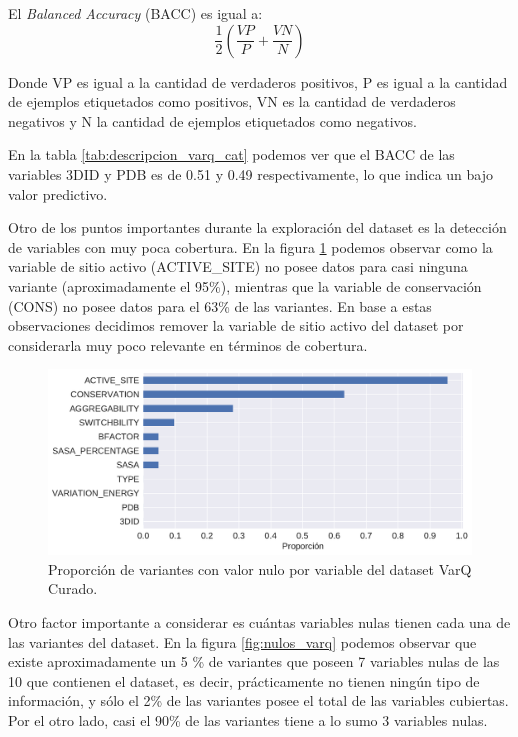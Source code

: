 El \textit{Balanced Accuracy} (BACC) es igual a:
\begin{equation*}
    \frac{1}{2} (\frac{VP}{P} + \frac{VN}{N})
\end{equation*}

Donde VP es igual a la cantidad de verdaderos positivos, P es igual a la cantidad de ejemplos etiquetados como positivos, VN es la cantidad de verdaderos negativos y N la cantidad de ejemplos etiquetados como negativos.

En la tabla \ref{tab:descripcion_varq_cat} podemos ver que el BACC de las variables 3DID y PDB es de 0.51 y 0.49 respectivamente, lo que indica un bajo valor predictivo. 

Otro de los puntos importantes durante la exploración del dataset es la detección de variables con muy poca cobertura. En la figura \ref{fig:proporcion_nulos_varq} podemos observar como la variable de sitio activo (ACTIVE\_SITE) no posee datos para casi ninguna variante (aproximadamente el 95\%), mientras que la variable de conservación (CONS) no posee datos para el 63\% de las variantes. En base a estas observaciones decidimos remover la variable de sitio activo del dataset por considerarla muy poco relevante en términos de cobertura.

\begin{figure}[H]
    \centering
    \includegraphics[scale=0.55]{documents/latex/figures/3/varq/proporcion_nulos.pdf}
    \caption{Proporción de variantes con valor nulo por variable del dataset VarQ Curado.}
    \label{fig:proporcion_nulos_varq}
\end{figure}

Otro factor importante a considerar es cuántas variables nulas tienen cada una de las variantes del dataset. En la figura \ref{fig:nulos_varq} podemos observar que existe aproximadamente un 5 \% de variantes que poseen 7 variables nulas de las 10 que contienen el dataset, es decir, prácticamente no tienen ningún tipo de información, y sólo el 2\% de las variantes posee el total de las variables cubiertas. Por el otro lado, casi el 90\% de las variantes tiene a lo sumo 3 variables nulas.

